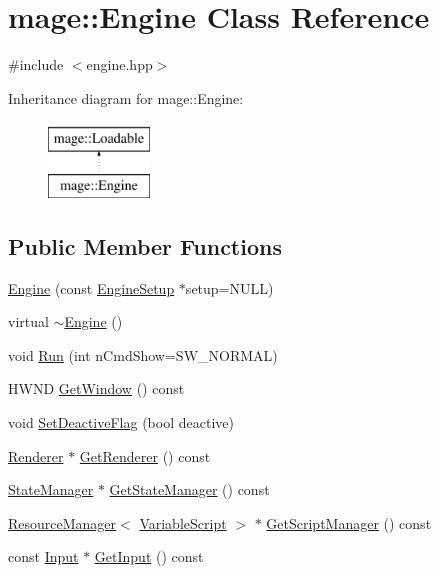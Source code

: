 \hypertarget{classmage_1_1_engine}{}\section{mage\+:\+:Engine Class Reference}
\label{classmage_1_1_engine}


{\ttfamily \#include $<$engine.\+hpp$>$}

Inheritance diagram for mage\+:\+:Engine\+:\begin{figure}[H]
\begin{center}
\leavevmode
\includegraphics[height=2.000000cm]{classmage_1_1_engine}
\end{center}
\end{figure}
\subsection*{Public Member Functions}
\begin{DoxyCompactItemize}
\item 
\hyperlink{classmage_1_1_engine_a5b49f3adf1dd889bb38f5325fd6db317}{Engine} (const \hyperlink{structmage_1_1_engine_setup}{Engine\+Setup} $\ast$setup=N\+U\+LL)
\item 
virtual \hyperlink{classmage_1_1_engine_a34628556f8397d70ed018d71e343c2f5}{$\sim$\+Engine} ()
\item 
void \hyperlink{classmage_1_1_engine_a246c82d0e55bc29e73aecbc365464ec8}{Run} (int n\+Cmd\+Show=S\+W\+\_\+\+N\+O\+R\+M\+AL)
\item 
H\+W\+ND \hyperlink{classmage_1_1_engine_a1c5f9d8c68045b36f404251359aa41e4}{Get\+Window} () const
\item 
void \hyperlink{classmage_1_1_engine_a942bfa9892fa79bb1068d7c7ec4e6732}{Set\+Deactive\+Flag} (bool deactive)
\item 
\hyperlink{classmage_1_1_renderer}{Renderer} $\ast$ \hyperlink{classmage_1_1_engine_a45a5005c7072937cb54a3f2f6431c66c}{Get\+Renderer} () const
\item 
\hyperlink{classmage_1_1_state_manager}{State\+Manager} $\ast$ \hyperlink{classmage_1_1_engine_a4f35bccc3784de531245a2549d537745}{Get\+State\+Manager} () const
\item 
\hyperlink{classmage_1_1_resource_manager}{Resource\+Manager}$<$ \hyperlink{classmage_1_1_variable_script}{Variable\+Script} $>$ $\ast$ \hyperlink{classmage_1_1_engine_af55c457336dcbc0e940578425c74d868}{Get\+Script\+Manager} () const
\item 
const \hyperlink{classmage_1_1_input}{Input} $\ast$ \hyperlink{classmage_1_1_engine_a5f21f58416ff6a8afea615d55c8c6c54}{Get\+Input} () const
\end{DoxyCompactItemize}
